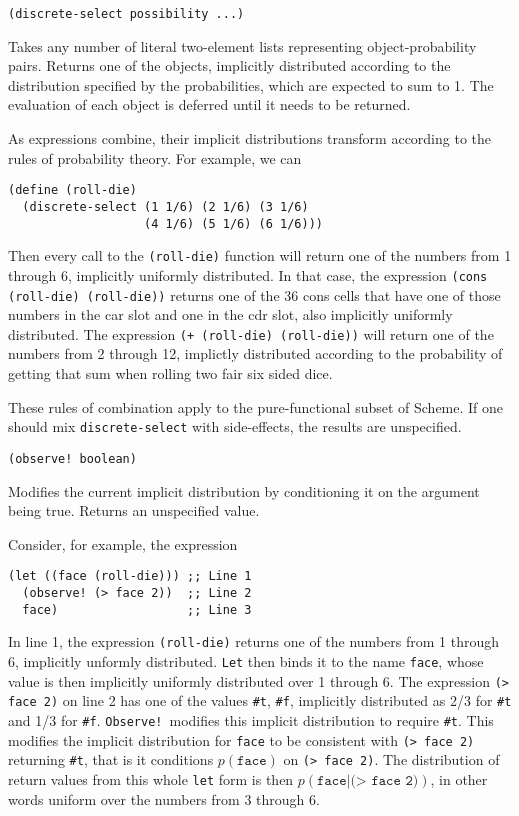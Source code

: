 \documentclass[12pt]{article}
\newcommand{\code}[1]{\texttt{#1}}
\begin{document}
\begin{verbatim}
(discrete-select possibility ...)
\end{verbatim}

Takes any number of literal two-element lists representing object-probability
pairs.
Returns one of the objects, implicitly distributed according to the
distribution specified by the probabilities, which are expected to 
sum to 1.  The evaluation of each object is deferred until it
needs to be returned.

As expressions combine, their implicit distributions transform according
to the rules of probability theory.  For example,
we can 
\begin{verbatim}
(define (roll-die)
  (discrete-select (1 1/6) (2 1/6) (3 1/6)
                   (4 1/6) (5 1/6) (6 1/6)))
\end{verbatim}
Then every call to the \code{(roll-die)} function will return one of
the numbers from 1 through 6, implicitly uniformly distributed.  In
that case, the expression \code{(cons (roll-die) (roll-die))} returns
one of the 36 cons cells that have one of those numbers in the car
slot and one in the cdr slot, also implicitly uniformly distributed.
The expression \code{(+ (roll-die) (roll-die))} will return one of the
numbers from 2 through 12, implictly distributed according to the
probability of getting that sum when rolling two fair six sided dice.

These rules of combination apply to the pure-functional subset of 
Scheme.  If one should mix \code{discrete-select} with side-effects,
the results are unspecified.

\begin{verbatim}
(observe! boolean)
\end{verbatim}

Modifies the current implicit distribution by conditioning
it on the argument being true.  Returns an unspecified value.

Consider, for example, the expression
\begin{verbatim}
(let ((face (roll-die))) ;; Line 1
  (observe! (> face 2))  ;; Line 2
  face)                  ;; Line 3
\end{verbatim}
In line 1, the expression \code{(roll-die)} returns one of the numbers
from 1 through 6, implicitly unformly distributed.  \code{Let} then
binds it to the name \code{face}, whose value is then implicitly
uniformly distributed over 1 through 6.  The expression \code{(> face
2)} on line 2 has one of the values \code{\#t}, \code{\#f}, implicitly
distributed as 2/3 for \code{\#t} and 1/3 for \code{\#f}.
\code{Observe!}\ modifies this implicit distribution to require
\code{\#t}.  This modifies the implicit distribution for \code{face}
to be consistent with \code{(> face 2)} returning \code{\#t}, that is
it conditions $p(\code{face})$ on \code{(> face 2)}.  The
distribution of return values from this whole \code{let} form is then
$p(\code{face}|\code{(> face 2)})$, in other words uniform over the
numbers from 3 through 6.
\end{document}
